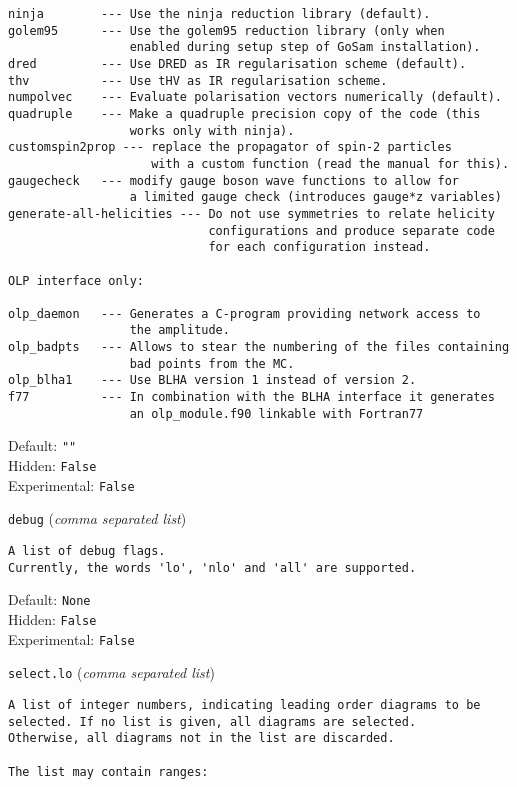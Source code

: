 \begin{basedescript}{\desclabelstyle{\pushlabel}}
\begin{verbatim}
ninja        --- Use the ninja reduction library (default).
golem95      --- Use the golem95 reduction library (only when
                 enabled during setup step of GoSam installation).
dred         --- Use DRED as IR regularisation scheme (default).
thv          --- Use tHV as IR regularisation scheme.
numpolvec    --- Evaluate polarisation vectors numerically (default).
quadruple    --- Make a quadruple precision copy of the code (this
                 works only with ninja).
customspin2prop --- replace the propagator of spin-2 particles
                    with a custom function (read the manual for this).
gaugecheck   --- modify gauge boson wave functions to allow for
                 a limited gauge check (introduces gauge*z variables)
generate-all-helicities --- Do not use symmetries to relate helicity
                            configurations and produce separate code
                            for each configuration instead.

OLP interface only:

olp_daemon   --- Generates a C-program providing network access to
                 the amplitude.
olp_badpts   --- Allows to stear the numbering of the files containing
                 bad points from the MC.
olp_blha1    --- Use BLHA version 1 instead of version 2.
f77          --- In combination with the BLHA interface it generates
                 an olp_module.f90 linkable with Fortran77
\end{verbatim}
Default: \verb|""|
\\Hidden: \verb|False|
\\Experimental: \verb|False|
\\\item[\colorbox{gray!30}{\texttt{debug}}] (\textit{comma separated list})
\begin{verbatim}
A list of debug flags.
Currently, the words 'lo', 'nlo' and 'all' are supported.
\end{verbatim}
Default: \verb|None|
\\Hidden: \verb|False|
\\Experimental: \verb|False|
\\\item[\colorbox{gray!30}{\texttt{select.lo}}] (\textit{comma separated list})
\begin{verbatim}
A list of integer numbers, indicating leading order diagrams to be
selected. If no list is given, all diagrams are selected.
Otherwise, all diagrams not in the list are discarded.

The list may contain ranges:


\end{verbatim}
\end{basedescript}
